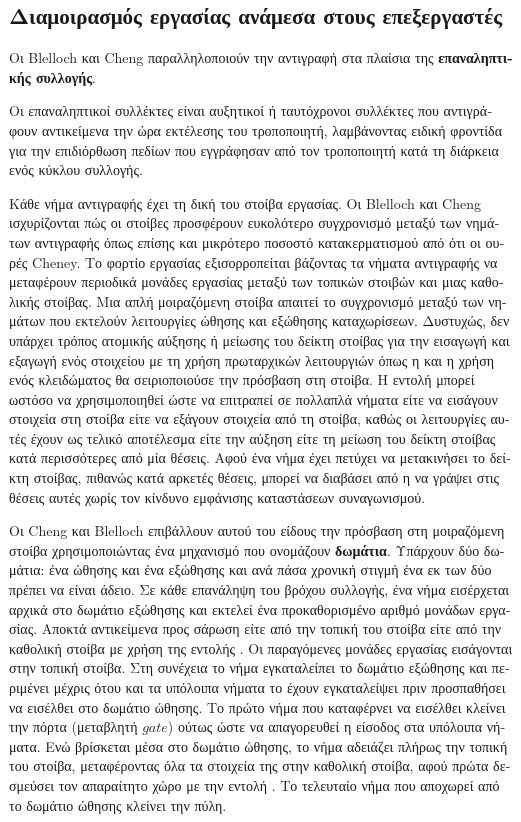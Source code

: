 \begin{greek}
\subsection{Διαμοιρασμός εργασίας ανάμεσα στους επεξεργαστές}
Οι Blelloch και Cheng \cite{DBLP:conf/pldi/BlellochC99, DBLP:conf/pldi/ChengB01}
παραλληλοποιούν την αντιγραφή στα πλαίσια της \textbf{επαναληπτικής
συλλογής}.

Οι επαναληπτικοί συλλέκτες είναι αυξητικοί ή ταυτόχρονοι συλλέκτες
που αντιγράφουν αντικείμενα την ώρα εκτέλεσης του τροποποιητή,
λαμβάνοντας ειδική φροντίδα για την επιδιόρθωση πεδίων που
εγγράφησαν από τον τροποποιητή κατά τη διάρκεια ενός κύκλου
συλλογής.

Κάθε νήμα αντιγραφής έχει τη δική του στοίβα εργασίας. Οι Blelloch
και Cheng ισχυρίζονται πώς οι στοίβες προσφέρουν ευκολότερο
συγχρονισμό μεταξύ των νημάτων αντιγραφής όπως επίσης και μικρότερο
ποσοστό κατακερματισμού από ότι οι ουρές Cheney. Το φορτίο εργασίας
εξισορροπείται βάζοντας τα νήματα αντιγραφής να μεταφέρουν περιοδικά
μονάδες εργασίας μεταξύ των τοπικών στοιβών και μιας καθολικής
στοίβας. Μια απλή μοιραζόμενη στοίβα απαιτεί το συγχρονισμό
μεταξύ των νημάτων που εκτελούν λειτουργίες ώθησης και εξώθησης
καταχωρίσεων. Δυστυχώς, δεν υπάρχει τρόπος ατομικής αύξησης
ή μείωσης του δείκτη στοίβας για την εισαγωγή και εξαγωγή ενός
στοιχείου με τη χρήση πρωταρχικών λειτουργιών όπως η \textenglish{}
και η χρήση ενός κλειδώματος θα σειριοποιούσε την πρόσβαση στη
στοίβα. Η εντολή \textenglish{} μπορεί ωστόσο να χρησιμοποιηθεί
ώστε να επιτραπεί σε πολλαπλά νήματα είτε να εισάγουν στοιχεία
στη στοίβα είτε να εξάγουν στοιχεία από τη στοίβα, καθώς
οι λειτουργίες αυτές έχουν ως τελικό αποτέλεσμα είτε την
αύξηση είτε τη μείωση του δείκτη στοίβας κατά περισσότερες
από μία θέσεις. Αφού ένα νήμα έχει πετύχει να μετακινήσει το
δείκτη στοίβας, πιθανώς κατά αρκετές θέσεις, μπορεί να διαβάσει
από η να γράψει στις θέσεις αυτές χωρίς τον κίνδυνο εμφάνισης
καταστάσεων συναγωνισμού.

Οι Cheng και Blelloch επιβάλλουν αυτού του είδους την πρόσβαση
στη μοιραζόμενη στοίβα χρησιμοποιώντας ένα μηχανισμό που
ονομάζουν \textbf{δωμάτια}. Υπάρχουν δύο δωμάτια: ένα ώθησης
και ένα εξώθησης και ανά πάσα χρονική στιγμή ένα εκ των δύο
πρέπει να είναι άδειο. Σε κάθε επανάληψη του βρόχου συλλογής,
ένα νήμα εισέρχεται αρχικά στο δωμάτιο εξώθησης και εκτελεί
ένα προκαθορισμένο αριθμό μονάδων εργασίας. Αποκτά αντικείμενα προς
σάρωση είτε από την τοπική του στοίβα είτε από την καθολική
στοίβα με χρήση της εντολής \textenglish{}. Οι παραγόμενες
μονάδες εργασίας εισάγονται στην τοπική στοίβα. Στη συνέχεια
το νήμα εγκαταλείπει το δωμάτιο εξώθησης και περιμένει μέχρις
ότου και τα υπόλοιπα νήματα το έχουν εγκαταλείψει πριν προσπαθήσει
να εισέλθει στο δωμάτιο ώθησης. Το πρώτο νήμα που καταφέρνει
να εισέλθει κλείνει την πόρτα (μεταβλητή $gate$) ούτως ώστε
να απαγορευθεί η είσοδος στα υπόλοιπα νήματα. Ενώ βρίσκεται
μέσα στο δωμάτιο ώθησης, το νήμα αδειάζει πλήρως την τοπική
του στοίβα, μεταφέροντας όλα τα στοιχεία της στην καθολική
στοίβα, αφού πρώτα δεσμεύσει τον απαραίτητο χώρο με την εντολή
\textenglish{}. Το τελευταίο νήμα που αποχωρεί από
το δωμάτιο ώθησης κλείνει την πύλη.


\end{greek}
